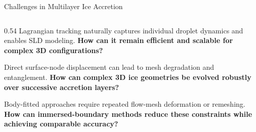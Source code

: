 \begin{frame}{Challenges in Multilayer Ice Accretion}

\vspace{0.1cm}

\begin{columns}[c,onlytextwidth]

\begin{column}{0.54\textwidth}
{Lagrangian tracking naturally captures individual
droplet dynamics and enables SLD modeling.
\textbf{How can it remain efficient and scalable
for complex 3D configurations?}}
\par\vspace{0.2cm}

{Direct surface-node displacement can lead to
mesh degradation and entanglement.
\textbf{How can complex 3D ice geometries be evolved
robustly over successive accretion layers?}}
\par\vspace{0.2cm}

{Body-fitted approaches require repeated
flow-mesh deformation or remeshing.
\textbf{How can immersed-boundary methods reduce
these constraints while achieving comparable accuracy?}}
\end{column}


\end{columns}
\end{frame}
